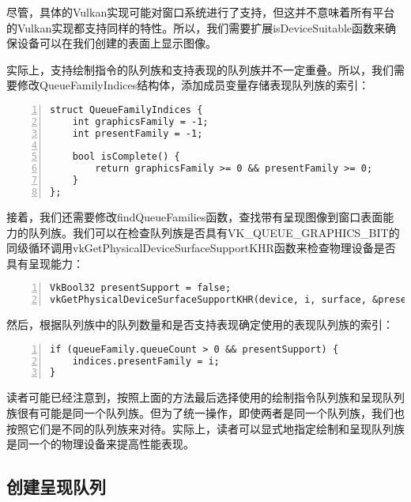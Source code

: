 \documentclass{ctexart}
\begin{document}
尽管，具体的Vulkan实现可能对窗口系统进行了支持，但这并不意味着所有平台的Vulkan实现都支持同样的特性。所以，我们需要扩展isDeviceSuitable函数来确保设备可以在我们创建的表面上显示图像。

实际上，支持绘制指令的队列族和支持表现的队列族并不一定重叠。所以，我们需要修改QueueFamilyIndices结构体，添加成员变量存储表现队列族的索引：

\begin{lstlisting}[language={[ANSI]C},keywordstyle=\color{blue!70},commentstyle=\color{red!50!green!50!blue!50},frame=shadowbox, rulesepcolor=\color{red!20!green!20!blue!20},basicstyle=\small,numbers=left, numberstyle=\tiny,breaklines=true]
struct QueueFamilyIndices {
	int graphicsFamily = -1;
	int presentFamily = -1;

	bool isComplete() {
		return graphicsFamily >= 0 && presentFamily >= 0;
	}
};
\end{lstlisting}

接着，我们还需要修改findQueueFamilies函数，查找带有呈现图像到窗口表面能力的队列族。我们可以在检查队列族是否具有VK\_QUEUE\_GRAPHICS\_BIT的同级循环调用vkGetPhysicalDeviceSurfaceSupportKHR函数来检查物理设备是否具有呈现能力：

\begin{lstlisting}[language={[ANSI]C},keywordstyle=\color{blue!70},commentstyle=\color{red!50!green!50!blue!50},frame=shadowbox, rulesepcolor=\color{red!20!green!20!blue!20},basicstyle=\small,numbers=left, numberstyle=\tiny,breaklines=true]
VkBool32 presentSupport = false;
vkGetPhysicalDeviceSurfaceSupportKHR(device, i, surface, &presentSupport);
\end{lstlisting}

然后，根据队列族中的队列数量和是否支持表现确定使用的表现队列族的索引：

\begin{lstlisting}[language={[ANSI]C},keywordstyle=\color{blue!70},commentstyle=\color{red!50!green!50!blue!50},frame=shadowbox, rulesepcolor=\color{red!20!green!20!blue!20},basicstyle=\small,numbers=left, numberstyle=\tiny,breaklines=true]
if (queueFamily.queueCount > 0 && presentSupport) {
	indices.presentFamily = i;
}
\end{lstlisting}

读者可能已经注意到，按照上面的方法最后选择使用的绘制指令队列族和呈现队列族很有可能是同一个队列族。但为了统一操作，即使两者是同一个队列族，我们也按照它们是不同的队列族来对待。实际上，读者可以显式地指定绘制和呈现队列族是同一个的物理设备来提高性能表现。

\subsection{创建呈现队列}
\end{document}
